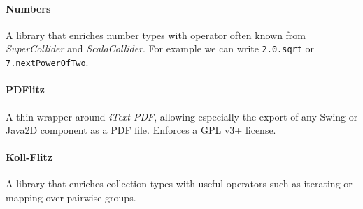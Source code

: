 \documentclass[11pt,a4paper]{article}
\newcommand{\software}[1]{\textit{#1}}
\begin{document}
\paragraph{Numbers}

A library that enriches number types with operator often known from \software{SuperCollider} and \software{ScalaCollider}. For example we can write \verb!2.0.sqrt! or \verb!7.nextPowerOfTwo!.

\paragraph{PDFlitz}

A thin wrapper around \software{iText PDF}, allowing especially the export of any Swing or Java2D component as a PDF file. Enforces a GPL v3+ license.

\paragraph{Koll-Flitz}

A library that enriches collection types with useful operators such as iterating or mapping over pairwise groups.

\printbibliography
\end{document}
